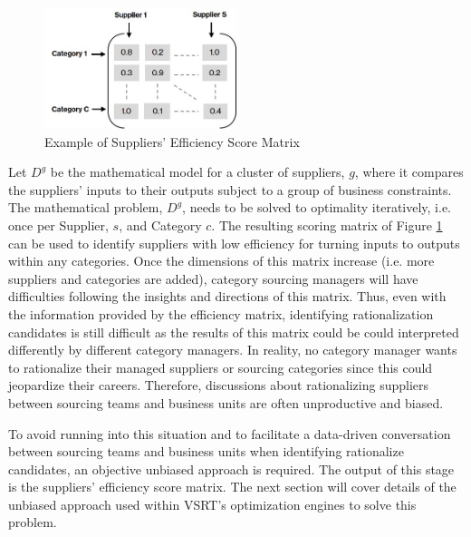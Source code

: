 \documentclass[inte,nonblindrev]{informs3} %
\begin{document}
\begin{figure}
	\includegraphics[width=0.5\textwidth]{ScoringMatrixBW.jpg}
    \caption{Example of Suppliers' Efficiency Score Matrix}
    \label{fig:fig4}
\end{figure}

Let $D^{g}$ be the mathematical model for a cluster of suppliers, $g$, where it compares the suppliers' inputs to their outputs subject to a group of business constraints. The mathematical problem, $D^{g}$, needs to be solved to optimality iteratively, i.e. once per Supplier, $s$, and Category $c$. The resulting scoring matrix of Figure \ref{fig:fig4} can be used to identify suppliers with low efficiency for turning inputs to outputs within any categories. Once the dimensions of this matrix increase (i.e. more suppliers and categories are added), category sourcing managers will have difficulties following the insights and directions of this matrix. Thus, even with the information provided by the efficiency matrix, identifying rationalization candidates is still difficult as the results of this matrix could be could interpreted differently by different category managers. In reality, no category manager wants to rationalize their managed suppliers or sourcing categories since this could jeopardize their careers. Therefore, discussions about rationalizing suppliers between sourcing teams and business units are often unproductive and biased. 

To avoid running into this situation and to facilitate a data-driven conversation between sourcing teams and business units when identifying rationalize candidates, an objective unbiased approach is required. The output of this stage is the suppliers' efficiency score matrix. The next section will cover details of the unbiased approach used within VSRT's optimization engines to solve this problem. 
\end{document}
